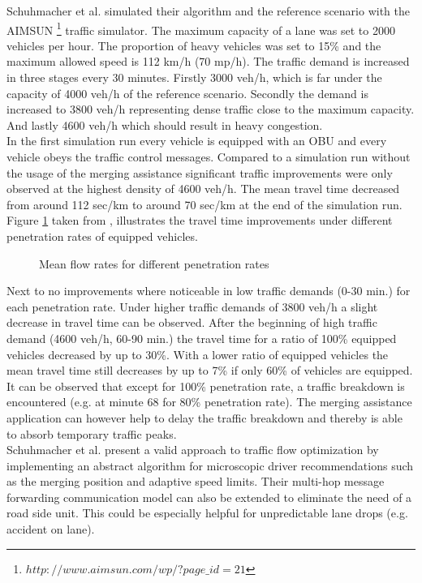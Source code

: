\documentclass{sig-alternate}
\begin{document}
Schuhmacher et al. simulated their algorithm and the reference scenario with the AIMSUN \footnote{$http://www.aimsun.com/wp/?page\_id=21$} traffic simulator. 
The maximum capacity of a lane was set to 2000 vehicles per hour. The proportion of heavy vehicles was set to 15\% and the maximum allowed speed is 112 km/h (70 mp/h). The traffic demand is increased in three stages every 30 minutes. Firstly 3000 veh/h, which is far under the capacity of 4000 veh/h of the reference scenario. Secondly the demand is increased to 3800 veh/h representing dense traffic close to the maximum capacity. And lastly 4600 veh/h which should result in heavy congestion. \\
In the first simulation run every vehicle is equipped with an OBU and every vehicle obeys the traffic control messages. Compared to a simulation run without the usage of the merging assistance significant traffic improvements were only observed at the highest density of 4600 veh/h. The mean travel time decreased from around 112 sec/km to around 70 sec/km at the end of the simulation run. \\
Figure \ref{fig:schuhmacher2} taken from \cite{1614269.1614274}, illustrates the travel time improvements under different penetration rates of equipped vehicles. 
\begin{figure} 
\centering
{}
\caption{Mean flow rates for different penetration rates}
\label{fig:schuhmacher2}
\end{figure}
Next to no improvements where noticeable in low traffic demands (0-30 min.) for each penetration rate. Under higher traffic demands of 3800 veh/h a slight decrease in travel time can be observed. After the beginning of high traffic demand (4600 veh/h, 60-90 min.) the travel time for a ratio of 100\% equipped vehicles decreased by up to 30\%. With a lower ratio of equipped vehicles the mean travel time still decreases by up to 7\% if only 60\% of vehicles are equipped. It can be observed that except for 100\% penetration rate, a traffic breakdown is encountered (e.g. at minute 68 for 80\% penetration rate). The merging assistance application can however help to delay the traffic breakdown and thereby is able to absorb temporary traffic peaks. \\
Schuhmacher et al. present a valid approach to traffic flow optimization by implementing an abstract algorithm for microscopic driver recommendations such as the merging position and adaptive speed limits. Their multi-hop message forwarding communication model can also be extended to eliminate the need of a road side unit. This could be especially helpful for unpredictable lane drops (e.g. accident on lane).
\end{document}
